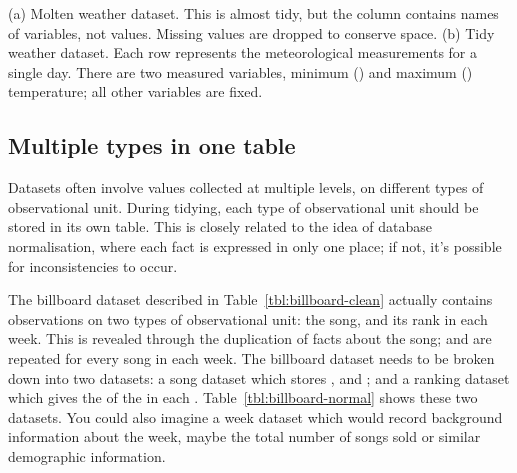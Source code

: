 \documentclass[article]{jss}
\begin{document}
\begin{table}[htbp]
  \centering
  \hspace{2em}%

  \caption{(a) Molten weather dataset.  This is almost tidy, but the  column contains names of variables, not values. Missing values are dropped to conserve space. (b) Tidy weather dataset. Each row represents the meteorological measurements for a single day.  There are two measured variables, minimum () and maximum () temperature; all other variables are fixed.}
  \label{tbl:weather-clean}
\end{table}

\subsection{Multiple types in one table}
\label{sub:multiple-types}

Datasets often involve values collected at multiple levels, on different types of observational unit. During tidying, each type of observational unit should be stored in its own table. This is closely related to the idea of database normalisation, where each fact is expressed in only one place; if not, it's possible for inconsistencies to occur. 


The billboard dataset described in Table~\ref{tbl:billboard-clean} actually contains observations on two types of observational unit: the song, and its rank in each week. This is revealed through the duplication of facts about the song;  and  are repeated for every song in each week. The billboard dataset needs to be broken down into two datasets: a song dataset which stores ,  and ; and a ranking dataset which gives the  of the  in each . Table~\ref{tbl:billboard-normal} shows these two datasets. You could also imagine a week dataset which would record background information about the week, maybe the total number of songs sold or similar demographic information.
\end{document}
